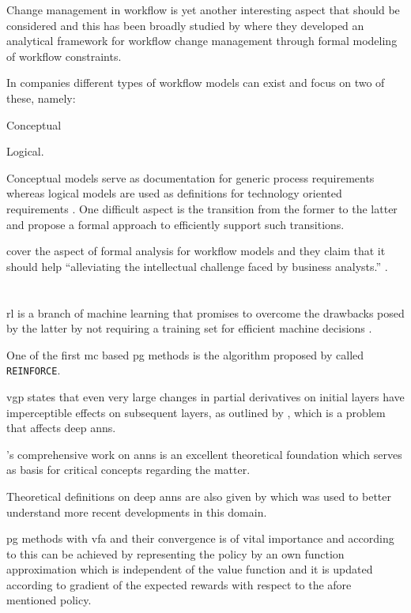 Change management in workflow is yet another interesting aspect that should be considered and this has been broadly studied by \citet{Wang2011} where they developed an analytical framework for workflow change management through formal modeling of workflow constraints.

In companies different types of workflow models can exist and \citet{Fan2012} focus on two of these, namely:
\begin{enumerate*}
	\item Conceptual
	\item Logical.
\end{enumerate*}

Conceptual models serve as documentation for generic process requirements whereas logical models are used as definitions for technology oriented requirements \citep{Fan2012}. One difficult aspect is the transition from the former to the latter and \citet{Fan2012} propose a formal approach to efficiently support such transitions.

\citet{Sun2013} cover the aspect of formal analysis for workflow models and they claim that it should help ``alleviating the intellectual challenge faced by business analysts.'' \citep[p. 2]{Sun2013}.

\section{}

\gls{rl} is a branch of machine learning that promises to overcome the drawbacks posed by the latter by not requiring a training set for efficient machine decisions \citep{Sutton2017}.

One of the first \gls{mc} based \gls{pg} methods is the algorithm proposed by \citet{Williams1992} called \texttt{REINFORCE}.

\gls{vgp} states that even very large changes in partial derivatives on initial layers have imperceptible effects on subsequent layers, as outlined by \citet{Bengio1994}, which is a problem that affects deep \glspl{ann}.

\citet{Haykin1998}'s comprehensive work on \glspl{ann} is an excellent theoretical foundation which serves as basis for critical concepts regarding the matter.

Theoretical definitions on deep \glspl{ann} are also given by \citet{Lecun1998} which was used to better understand more recent developments in this domain.

\gls{pg} methods with \gls{vfa} and their convergence is of vital importance and according to \citet{Sutton1999} this can be achieved by representing the policy by an own function approximation which is independent of the value function and it is updated according to gradient of the expected rewards with respect to the afore mentioned policy.

